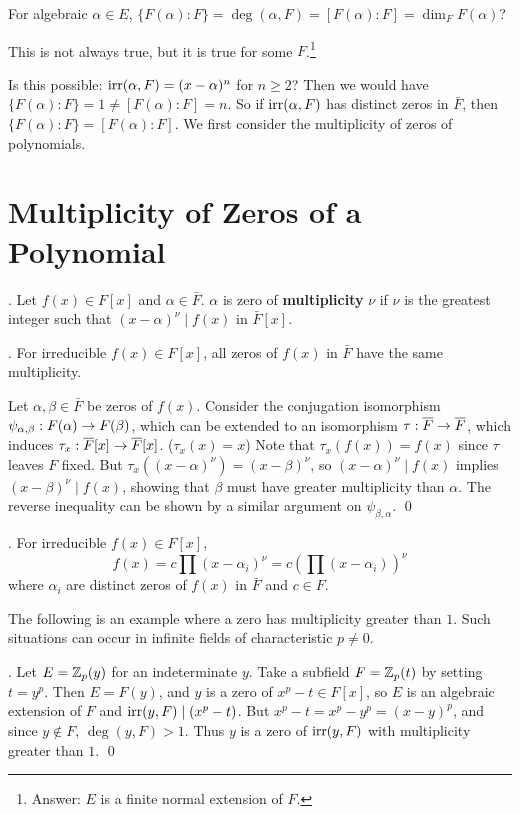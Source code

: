 \question For algebraic \(\alpha \in E\), \(\{F(\alpha) : F\} = \deg(\alpha, F) = [F(\alpha) : F] = \dim_F F(\alpha)\)?

This is not always true, but it is true for some \(F\).\footnote{Answer: \(E\) is a finite normal extension of \(F\).}

\pagebreak


Is this possible: \(\mathrm{irr}(\alpha, F) = (x - \alpha)^n\) for \(n \geq 2\)? Then we would have \(\{F(\alpha) : F\} = 1 \neq [F(\alpha) : F] = n\). So if \(\mathrm{irr}(\alpha, F)\) has distinct zeros in \(\bar{F}\), then \(\{F(\alpha) : F\} = [F(\alpha) : F]\). We first consider the multiplicity of zeros of polynomials.

\section*{Multiplicity of Zeros of a Polynomial}

.  Let \(f(x) \in F[x]\) and \(\alpha \in \bar{F}\). \(\alpha\) is zero of \textbf{multiplicity} \(\nu\) if \(\nu\) is the greatest integer such that \((x - \alpha)^\nu \mid f(x)\) in \(\bar{F}[x]\).

\thm. For irreducible \(f(x) \in F[x]\), all zeros of \(f(x)\) in \(\bar{F}\) have the same multiplicity.

\pf Let \(\alpha, \beta \in \bar{F}\) be zeros of \(f(x)\). Consider the conjugation isomorphism \(\psi_{\alpha, \beta} : F(\alpha) \rightarrow F(\beta)\), which can be extended to an isomorphism \(\tau : \bar{F} \ra \bar{F}\), which induces \(\tau_x : \bar{F}[x] \ra \bar{F}[x]\). (\(\tau_x(x) = x\)) Note that \(\tau_x(f(x)) = f(x)\) since \(\tau\) leaves \(F\) fixed. But \(\tau_x((x-\alpha)^\nu) = (x-\beta)^\nu\), so \((x - \alpha)^\nu \mid f(x)\) implies \((x - \beta)^\nu \mid f(x)\), showing that \(\beta\) must have greater multiplicity than \(\alpha\). The reverse inequality can be shown by a similar argument on \(\psi_{\beta, \alpha}\). \qed

\cor. For irreducible \(f(x) \in F[x]\),
\[
    f(x) = c \prod (x - \alpha_i)^\nu = c \left(\prod (x - \alpha_i)\right)^\nu
\]
where \(\alpha_i\) are distinct zeros of \(f(x)\) in \(\bar{F}\) and \(c \in F\).

The following is an example where a zero has multiplicity greater than \(1\). Such situations can occur in infinite fields of characteristic \(p \neq 0\).

\ex. Let \(E = \mathbb{Z}_p(y)\) for an indeterminate \(y\). Take a subfield \(F = \mathbb{Z}_p(t)\) by setting \(t = y^p\). Then \(E = F(y)\), and \(y\) is a zero of \(x^p - t \in F[x]\), so \(E\) is an algebraic extension of \(F\) and \(\mathrm{irr}(y, F) \mid (x^p -t)\).  But \(x^p - t = x^p - y^p = (x - y)^p\), and since \(y \notin F\), \(\deg(y, F) > 1\). Thus \(y\) is a zero of \(\mathrm{irr}(y, F)\) with multiplicity greater than \(1\). \qed

\smallskip
